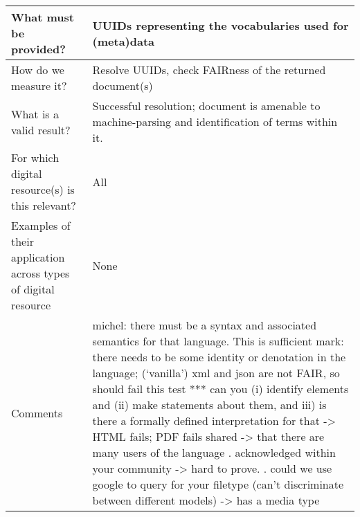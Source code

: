 \documentclass[english]{article}
\begin{document}
\begin{longtable}{|p{5cm}|p{9cm}|}
\\



\hline
What must be provided? &  


UUIDs representing the vocabularies used for (meta)data 


\\



\hline
How do we measure it? &  


Resolve UUIDs, check FAIRness of the returned document(s)


\\



\hline
What is a valid result? &  



Successful resolution; document is amenable to machine-parsing and identification of terms within it.



\\



\hline
For which digital resource(s) is this relevant? &  All\\



\hline
Examples of their application across types of digital resource &  None

\\



\hline

Comments & 

michel: there must be a syntax and associated semantics for that language.  This is sufficient \newline 
mark: there needs to be some identity or denotation in the language; (‘vanilla’) xml and json are not FAIR, so should fail this test\newline 
\newline 
*** can you (i) identify elements and (ii) make statements about them, and iii) is there a formally defined interpretation for that 
 -> HTML fails; PDF fails
\newline 
shared\newline 
-> that there are many users of the language\newline 
. acknowledged within your community\newline 
 -> hard to prove.\newline 
. could we use google to query for your filetype (can’t discriminate between different models)\newline 
-> has a media type\newline 


\end{longtable}
\end{document}
